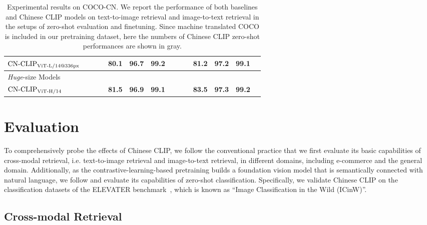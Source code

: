 \documentclass[11pt]{article}
\begin{document}
\begin{table*}[t]
\begin{adjustbox}{max width=1.\textwidth}
\begin{tabular}{@{\extracolsep{\fill}}lccccccccccccc}
    $\text{CN-CLIP}\rm_{ViT\text{-}L/14@336px}$
    & \color{gray}{64.7}	& \color{gray}{89.6}	& \color{gray}{94.6}	& \textbf{80.1}	& \textbf{96.7}	& \textbf{99.2} & \color{gray}{63.4}	& \color{gray}{87.2}	& \color{gray}{94.4}	& \textbf{81.2}	& \textbf{97.2}	& 99.1
    \\
\midrule
    \multicolumn{9}{l}{\textit{Huge}-size Models} \\
    $\text{CN-CLIP}\rm_{ViT\text{-}H/14}$
    & \color{gray}{69.2}	& \color{gray}{89.9}	& \color{gray}{96.1}	& \textbf{81.5}	& \textbf{96.9}	& \textbf{99.1}	& \color{gray}{63.0}	& \color{gray}{86.6}	& \color{gray}{92.9}	& \textbf{83.5}	& \textbf{97.3}	& \textbf{99.2}
    \\    
\bottomrule
\end{tabular}
\end{adjustbox}
\caption{Experimental results on COCO-CN. We report the performance of both baselines and Chinese CLIP models on text-to-image retrieval and image-to-text retrieval in the setups of zero-shot evaluation and finetuning. Since machine translated COCO is included in our pretraining dataset, here the numbers of Chinese CLIP zero-shot performances are shown in gray.}
\label{tb:coco}
\end{table*} 
\section{Evaluation}
To comprehensively probe the effects of Chinese CLIP, we follow the conventional practice that we first evaluate its basic capabilities of cross-modal retrieval, i.e. text-to-image retrieval and image-to-text retrieval, in different domains, including e-commerce and the general domain. 
Additionally, as the contrastive-learning-based pretraining builds a foundation vision model that is semantically connected with natural language, we follow \citet{clip} and evaluate its capabilities of zero-shot classification. Specifically, we validate Chinese CLIP on the classification datasets of the ELEVATER benchmark~\citep{elevater}, which is known as ``Image Classification in the Wild (ICinW)''. 

\subsection{Cross-modal Retrieval}
\end{document}
